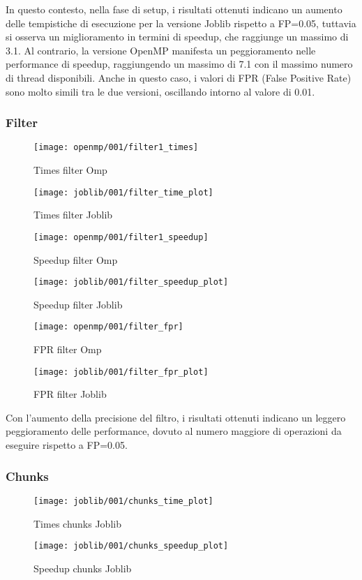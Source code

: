 In questo contesto, nella fase di setup,
i risultati ottenuti indicano un aumento delle tempistiche di esecuzione per la versione Joblib
rispetto a FP=0.05, tuttavia si osserva un miglioramento in termini di speedup, che raggiunge un massimo di 3.1.
Al contrario, la versione OpenMP manifesta un peggioramento nelle performance di speedup,
raggiungendo un massimo di 7.1 con il massimo numero di thread disponibili.
Anche in questo caso, i valori di FPR (False Positive Rate) sono molto simili tra le due versioni, oscillando intorno
al valore di 0.01.

\subsubsection{Filter}\label{subsubsec:filter}
\begin{figure}[H]
    \centering
    \texttt{[image: openmp/001/filter1\_times]}
        \caption{Times filter Omp}\label{fig:filter_time_omp}
    \endminipage\hfill
    \texttt{[image: joblib/001/filter\_time\_plot]}
        \caption{Times filter Joblib}\label{fig:filter_time_joblib}
    \endminipage\hfill
\end{figure}
\begin{figure}[H]
    \centering
    \texttt{[image: openmp/001/filter1\_speedup]}
        \caption{Speedup filter Omp}\label{fig:filter_speedup_omp}
    \endminipage\hfill
    \texttt{[image: joblib/001/filter\_speedup\_plot]}
        \caption{Speedup filter Joblib}\label{fig:filter_speedup_joblib}
    \endminipage\hfill
\end{figure}
\begin{figure}[H]
    \centering
    \texttt{[image: openmp/001/filter\_fpr]}
        \caption{FPR filter Omp}\label{fig:filter_fpr_omp}
    \endminipage\hfill
    \texttt{[image: joblib/001/filter\_fpr\_plot]}
        \caption{FPR filter Joblib}\label{fig:filter_fpr_joblib}
    \endminipage\hfill
\end{figure}

Con l'aumento della precisione del filtro, i risultati ottenuti indicano un leggero peggioramento delle performance,
dovuto al numero maggiore di operazioni da eseguire rispetto a FP=0.05.

\subsubsection{Chunks}\label{subsubsec:chunks}
\begin{figure}[H]
    \centering
    \texttt{[image: joblib/001/chunks\_time\_plot]}
        \caption{Times chunks Joblib}\label{fig:chunks_time_joblib}
    \endminipage\hfill
    \texttt{[image: joblib/001/chunks\_speedup\_plot]}
        \caption{Speedup chunks Joblib}\label{fig:chunks_speedup_joblib}
    \endminipage\hfill
\end{figure}

